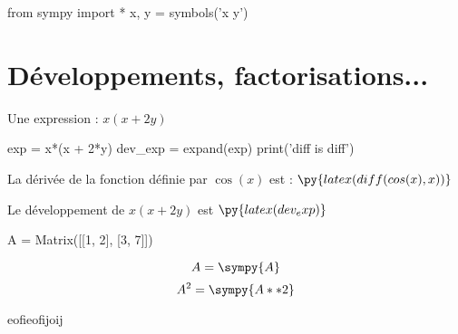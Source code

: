 \documentclass[12pt,a4paper]{article}
\begin{document}
\begin{pycode}
from sympy import *
x, y = symbols('x y')
\end{pycode}



\section{Développements, factorisations...}
Une expression : $x(x + 2y)$
\begin{pycode}
exp = x*(x + 2*y)
dev_exp = expand(exp)
print('diff is diff')
\end{pycode}


La dérivée de la fonction définie par $\cos(x)$ est : $\py{latex(diff(cos(x), x))}$

Le développement de $x(x + 2y)$ est $\py{latex(dev_exp)}$



\begin{sympycode}
A = Matrix([[1, 2], [3, 7]])
\end{sympycode}
%
\begin{equation}
A 
=
\sympy{A}
\end{equation}
%
%
\begin{equation*}
A^2 
=
\sympy{A**2}
\end{equation*}

eofieofijoij
\end{document}

